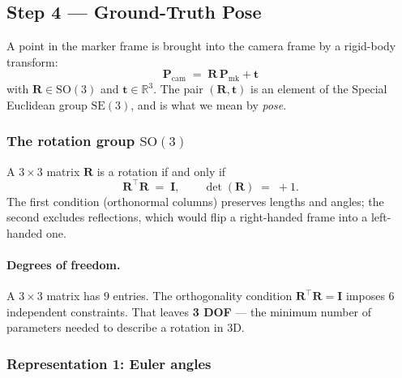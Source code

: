 \documentclass[11pt,a4paper]{article}
\theoremstyle{definition}
\theoremstyle{plain}
\theoremstyle{remark}
\newcommand{\R}{\mathbb{R}}
\newcommand{\SO}[1]{\mathrm{SO}(#1)}
\newcommand{\SE}[1]{\mathrm{SE}(#1)}
\newcommand{\Pcam}{\mathbf{P}_{\text{cam}}}
\newcommand{\Pmark}{\mathbf{P}_{\text{mk}}}
\begin{document}
\subsection{Step 4 --- Ground-Truth Pose}

A point in the marker frame is brought into the camera frame by a
rigid-body transform:
\begin{equation}
  \boxed{\quad \Pcam \;=\; \mathbf{R}\,\Pmark + \mathbf{t} \quad}
  \label{eq:rigid-transform}
\end{equation}
with $\mathbf{R} \in \SO{3}$ and $\mathbf{t} \in \R^3$. The pair
$(\mathbf{R}, \mathbf{t})$ is an element of the Special Euclidean group
$\SE{3}$, and is what we mean by \emph{pose}.

\subsubsection{The rotation group \texorpdfstring{$\SO{3}$}{SO(3)}}

A $3\times 3$ matrix $\mathbf{R}$ is a rotation if and only if
\begin{equation}
  \mathbf{R}^\top \mathbf{R} \;=\; \mathbf{I},
  \qquad
  \det(\mathbf{R}) \;=\; +1.
  \label{eq:so3-constraints}
\end{equation}
The first condition (orthonormal columns) preserves lengths and angles; the
second excludes reflections, which would flip a right-handed frame into a
left-handed one.

\paragraph{Degrees of freedom.}
A $3\times 3$ matrix has $9$ entries. The orthogonality condition
$\mathbf{R}^\top \mathbf{R} = \mathbf{I}$ imposes $6$ independent constraints. That
leaves \textbf{3 DOF} --- the minimum number of parameters needed to
describe a rotation in 3D.

\subsubsection{Representation 1: Euler angles}
\end{document}
